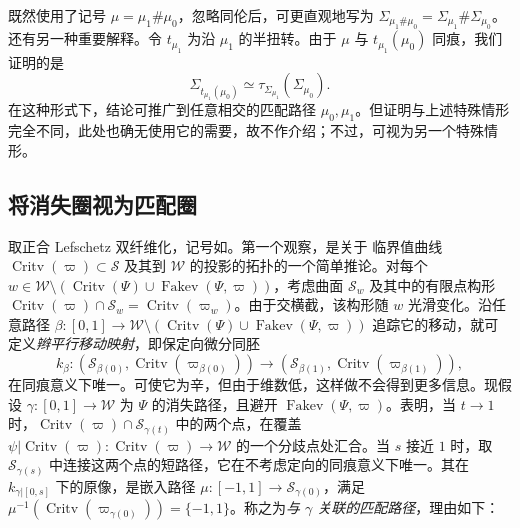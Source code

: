 \begin{note}\label{st:16.14}
既然使用了记号 $\mu=\mu_1\#\mu_0$，忽略同伦后，可更直观地写为 $\Sigma_{\mu_1\#\mu_0}=\Sigma_{\mu_1}\#\Sigma_{\mu_0}$。还有另一种重要解释。令 $t_{\mu_1}$ 为沿 $\mu_1$ 的半扭转。由于 $\mu$ 与 $t_{\mu_1}(\mu_0)$ 同痕，我们证明的是
\[
\Sigma_{t_{\mu_1}(\mu_0)}\simeq\tau_{\Sigma_{\mu_1}}(\Sigma_{\mu_0}).
\]
在这种形式下，结论可推广到任意相交的匹配路径 $\mu_0,\mu_1$。但证明与上述特殊情形完全不同，此处也确无使用它的需要，故不作介绍；不过，可视为另一个特殊情形。
\end{note}

\subsection{将消失圈视为匹配圈}\label{sec:16i}
取正合 Lefschetz 双纤维化，记号如。第一个观察，是关于
临界值曲线 $\operatorname{Critv}(\varpi)\subset\mathcal S$ 及其到 $\mathcal W$ 的投影的拓扑的一个简单推论。对每个 $w\in\mathcal W\setminus(\operatorname{Critv}(\Psi)\cup\operatorname{Fakev}(\Psi,\varpi))$，考虑曲面 $\mathcal S_w$ 及其中的有限点构形 $\operatorname{Critv}(\varpi)\cap\mathcal S_w=\operatorname{Critv}(\varpi_w)$。由于交横截，该构形随 $w$ 光滑变化。沿任意路径 $\beta:[0,1]\to\mathcal W\setminus(\operatorname{Critv}(\Psi)\cup\operatorname{Fakev}(\Psi,\varpi))$ 追踪它的移动，就可定义\emph{辫平行移动映射}，即保定向微分同胚
\[
k_\beta:(\mathcal S_{\beta(0)},\operatorname{Critv}(\varpi_{\beta(0)}))
\longrightarrow(\mathcal S_{\beta(1)},\operatorname{Critv}(\varpi_{\beta(1)})),
\]
在同痕意义下唯一。可使它为辛，但由于维数低，这样做不会得到更多信息。现假设 $\gamma:[0,1]\to\mathcal W$ 为 $\Psi$ 的消失路径，且避开 $\operatorname{Fakev}(\Psi,\varpi)$。表明，当 $t\to1$ 时，$\operatorname{Critv}(\varpi)\cap\mathcal S_{\gamma(t)}$ 中的两个点，在覆盖 $\psi|\operatorname{Critv}(\varpi):\operatorname{Critv}(\varpi)\to\mathcal W$ 的一个分歧点处汇合。当 $s$ 接近 $1$ 时，取 $\mathcal S_{\gamma(s)}$ 中连接这两个点的短路径，它在不考虑定向的同痕意义下唯一。其在 $k_{\gamma|[0,s]}$ 下的原像，是嵌入路径 $\mu:[-1,1]\to\mathcal S_{\gamma(0)}$，满足 $\mu^{-1}(\operatorname{Critv}(\varpi_{\gamma(0)}))=\{-1,1\}$。称之为\emph{与 $\gamma$ 关联的匹配路径}，理由如下：


